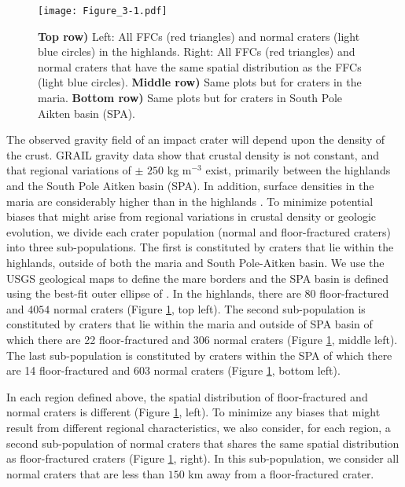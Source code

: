 \begin{figure}[h!]
  \graphicspath{ {/Users/thorey/Documents/These/Projet/FFC/Gravi_GRAIL/Article/Papier/Proof/} }
  \begin{center}

    \texttt{[image: Figure\_3-1.pdf]}
    \caption{\textbf{Top  row)} Left:  All  FFCs  (red triangles)  and
      normal craters (light blue circles) in the highlands. Right: All
      FFCs  (red triangles)  and  normal craters  that  have the  same
      spatial    distribution     as    the    FFCs     (light    blue
      circles). \textbf{Middle row)} Same plots but for craters in the
      maria.  \textbf{Bottom row)} Same plots but for craters in South
      Pole Aikten basin (SPA).}
    \label{C6-Figure3-1}
  \end{center}
\end{figure}

The observed  gravity field of an  impact crater will depend  upon the
density of the crust. GRAIL gravity  data show that crustal density is
not constant, and that regional  variations of $\pm$ $250$ kg m$^{-3}$
exist, primarily between the highlands and the South Pole Aitken basin
(SPA). In  addition, surface densities  in the maria  are considerably
higher  than in  the highlands  \citep{Besserer:2014jr}.  To  minimize
potential biases that might arise  from regional variations in crustal
density  or  geologic  evolution,  we divide  each  crater  population
(normal and floor-fractured craters)  into three sub-populations.  The
first is constituted by craters that lie within the highlands, outside
of  both the  maria  and South  Pole-Aitken basin.   We  use the  USGS
geological  maps to  define  the mare  borders and  the  SPA basin  is
defined      using     the      best-fit     outer      ellipse     of
\citet{GarrickBethell:2009dx}.   In  the  highlands,  there  are  $80$
floor-fractured and $4054$ normal craters (Figure \ref{C6-Figure3-1}, top
left).  The second  sub-population is constituted by  craters that lie
within  the maria  and outside  of  SPA basin  of which  there are  22
floor-fractured and 306 normal craters (Figure \ref{C6-Figure3-1}, middle
left).  The last  sub-population is constituted by  craters within the
SPA  of which  there are  14  floor-fractured and  603 normal  craters
(Figure \ref{C6-Figure3-1}, bottom left).
	 
In   each  region   defined   above,  the   spatial  distribution   of
floor-fractured    and   normal    craters   is    different   (Figure
\ref{C6-Figure3-1}, left).  To minimize any biases that might result from
different regional characteristics, we also consider, for each region,
a second sub-population of normal craters that shares the same spatial
distribution as floor-fractured craters  (Figure \ref{C6-Figure3-1},
right).  In this  sub-population, we consider all  normal craters that
are less than $150$ km away from a floor-fractured crater.

